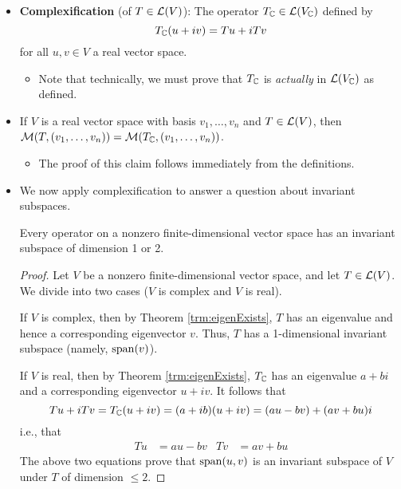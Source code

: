 \documentclass[../main.tex]{subfiles}
\begin{document}
\begin{itemize}
    \item \textbf{Complexification} (of $T\in\mathcal{L}(V)$): The operator $T_{\mathbb{C}}\in\mathcal{L}(V_{\mathbb{C}})$ defined by
    \begin{equation*}
        T_{\mathbb{C}}(u+iv) = Tu+iTv
    \end{equation*}
    for all $u,v\in V$ a real vector space.
    \begin{itemize}
        \item Note that technically, we must prove that $T_{\mathbb{C}}$ is \emph{actually} in $\mathcal{L}(V_{\mathbb{C}})$ as defined.
    \end{itemize}
    \item If $V$ is a real vector space with basis $v_1,\dots,v_n$ and $T\in\mathcal{L}(V)$, then $\mathcal{M}(T,(v_1,\dots,v_n))=\mathcal{M}(T_{\mathbb{C}},(v_1,\dots,v_n))$.
    \begin{itemize}
        \item The proof of this claim follows immediately from the definitions.
    \end{itemize}
    \item We now apply complexification to answer a question about invariant subspaces.
    \begin{theorem}\label{trm:inv12}
        Every operator on a nonzero finite-dimensional vector space has an invariant subspace of dimension 1 or 2.
        \begin{proof}
            Let $V$ be a nonzero finite-dimensional vector space, and let $T\in\mathcal{L}(V)$. We divide into two cases ($V$ is complex and $V$ is real).\par
            If $V$ is complex, then by Theorem \ref{trm:eigenExists}, $T$ has an eigenvalue and hence a corresponding eigenvector $v$. Thus, $T$ has a 1-dimensional invariant subspace (namely, $\operatorname{span}(v)$).\par
            If $V$ is real, then by Theorem \ref{trm:eigenExists}, $T_{\mathbb{C}}$ has an eigenvalue $a+bi$ and a corresponding eigenvector $u+iv$. It follows that
            \begin{equation*}
                Tu+iTv = T_{\mathbb{C}}(u+iv) = (a+ib)(u+iv) = (au-bv)+(av+bu)i
            \end{equation*}
            i.e., that
            \begin{align*}
                Tu &= au-bv&
                Tv &= av+bu
            \end{align*}
            The above two equations prove that $\operatorname{span}(u,v)$ is an invariant subspace of $V$ under $T$ of dimension $\leq 2$.
        \end{proof}

\end{theorem}
\end{itemize}
\end{document}
